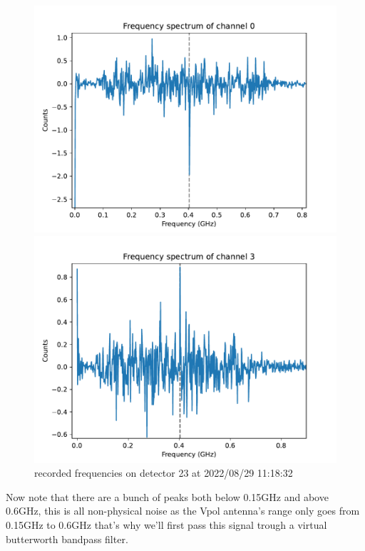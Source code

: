 \documentclass[11pt,a4paper,faculty=we,language=en,doctype=report]{cls/ugent-doc}
\begin{document}
\begin{figure}
	\begin{minipage}{0.49\textwidth}
		\includegraphics[width=\textwidth]{figures/23-800-0-freq.pdf}
	\end{minipage}
	\begin{minipage}{0.49\textwidth}
		\includegraphics[width=\textwidth]{figures/23-800-3-freq.pdf}
	\end{minipage}
	\caption{recorded frequencies on detector 23 at 2022/08/29 11:18:32}
	\label{fig:freqs03}
\end{figure}
Now note that there are a bunch of peaks both below 0.15GHz and above 0.6GHz,
this is all non-physical noise as the Vpol antenna's range only goes from
0.15GHz to 0.6GHz \cite{Aguilar_2021} that's why we'll first pass this signal
trough a virtual butterworth bandpass filter.
\end{document}
